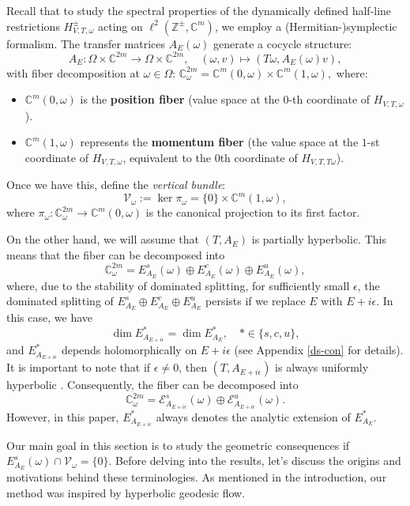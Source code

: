 \documentclass[11pt]{amsart}
\theoremstyle{remark}
\theoremstyle{definition}
\newcommand{\E}{{\mathbf E}}
\def \E{\mathcal{E}}
\begin{document}
Recall that to study the spectral properties of the dynamically defined  half-line restrictions \( H^{\pm}_{V,T,\omega} \) acting on \( \ell^2(\mathbb{Z}^{\pm}, \mathbb{C}^m) \), we employ a (Hermitian-)symplectic formalism. The transfer matrices \( A_E(\omega) \) generate a cocycle structure:
$$
A_E: \Omega \times \mathbb{C}^{2m} \to \Omega \times \mathbb{C}^{2m}, \quad (\omega, v) \mapsto (T\omega, A_E(\omega)v), 
$$
with fiber decomposition at \( \omega \in \Omega \):
$
\mathbb{C}^{2m}_\omega = \mathbb{C}^m(0,\omega) \times \mathbb{C}^m(1,\omega),$
where:
\begin{itemize}
    \item \( \mathbb{C}^m(0,\omega) \) is the \textbf{position fiber} 
    (value space at the $0$-th coordinate of \( H_{V,T,\omega} \)).
    \item \( \mathbb{C}^m(1,\omega) \)  represents the \textbf{momentum fiber} (the value space at the $1$-st coordinate of \( H_{V,T,\omega} \), equivalent to the 0th coordinate of \( H_{V,T,T\omega} \)).
\end{itemize}
Once we have this, define the \textit{vertical bundle}: 
    \[
    \mathcal{V}_\omega := \ker \pi_\omega = \{0\} \times \mathbb{C}^m(1,\omega),
    \]
    where \( \pi_\omega: \mathbb{C}^{2m}_\omega \to \mathbb{C}^m(0,\omega) \) is the canonical projection to its first factor.
    
On the other hand, we will assume that $(T, A_E)$ is partially hyperbolic. This means that the fiber can be decomposed into
$$
\mathbb{C}^{2m}_\omega = E^s_{A_E}(\omega) \oplus E^c_{A_E}(\omega) \oplus E^u_{A_E}(\omega),
$$
where, due to the stability of dominated splitting, for sufficiently small $\epsilon$, the dominated splitting of $E^s_{A_E} \oplus E^c_{A_E} \oplus E^u_{A_E}$ persists if we replace $E$ with $E + i\epsilon$. In this case, we have
$$
\dim E^{\ast}_{A_{E+i\epsilon}} = \dim E^\ast_{A_E}, \quad \ast \in \{s, c, u\},
$$
and $E^\ast_{A_{E+i\epsilon}}$ depends holomorphically on $E + i\epsilon$ (see Appendix \ref{ds-con} for details). It is important to note that if $\epsilon \neq 0$, then $(T, A_{E+i\epsilon})$ is always uniformly hyperbolic \cite{Puig}. Consequently, the fiber can be decomposed into
$$
\mathbb{C}^{2m}_\omega = \E^s_{A_{E+i\epsilon}}(\omega) \oplus \E^u_{A_{E+i\epsilon}}(\omega).
$$
However, in this paper, $E^{\ast}_{A_{E+i\epsilon}}$  always denotes the analytic extension of $E^{\ast}_{A_{E}}$.

Our main goal in this section is to study the geometric consequences if
$
E^s_{A_E}(\omega) \cap \mathcal{V}_\omega = \{0\}.
$
Before delving into the results, let's discuss the origins and motivations behind these terminologies. As mentioned in the introduction, our method was inspired by hyperbolic geodesic flow.
\end{document}
